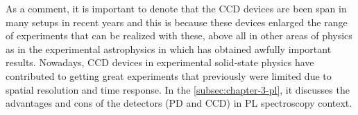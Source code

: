 
As a comment, it is important to denote that the CCD devices are been span in many setups in recent years and this is because these devices enlarged the range of experiments that can be realized with these, above all in other areas of physics as in the experimental astrophysics in which has obtained awfully important results.  Nowadays, CCD devices in experimental solid-state physics have contributed to getting great experiments that previously were limited due to spatial resolution and time response.  In the \cref{subsec:chapter-3-pl}, it discusses the advantages and cons of the detectors (PD and CCD)  in PL spectroscopy context. 


